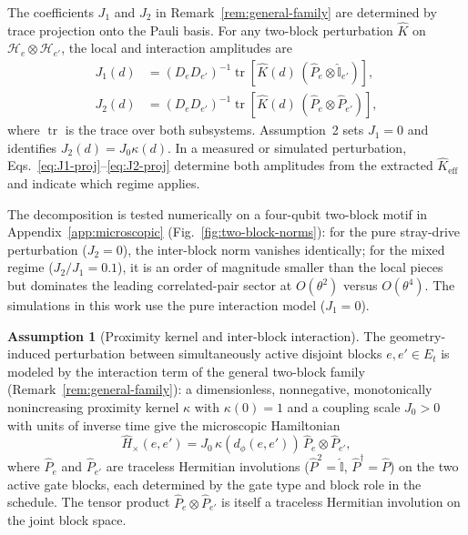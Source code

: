\documentclass[
aps,
prx,
10pt,
twocolumn,
groupedaddress,
longbibliography,
nofootinbib,
floatfix
]{revtex4-2}
\theoremstyle{definition}
\newtheorem{assumption}{Assumption}
\newcommand{\I}{\hat{\mathbb{I}}}
\newcommand{\Hx}{\hat H_{\times}}
\begin{document}
The coefficients $J_1$ and $J_2$ in Remark~\ref{rem:general-family} are determined by trace projection onto the Pauli basis. For any two-block perturbation $\hat K$ on $\mathcal{H}_e\otimes\mathcal{H}_{e'}$, the local and interaction amplitudes are
\begin{align}
J_1(d) &= (D_e D_{e'})^{-1}\operatorname{tr}\!\left[\hat K(d)\,(\hat P_e\otimes\I_{e'})\right],\label{eq:J1-proj}\\
J_2(d) &= (D_e D_{e'})^{-1}\operatorname{tr}\!\left[\hat K(d)\,(\hat P_e\otimes\hat P_{e'})\right],\label{eq:J2-proj}
\end{align}
where $\operatorname{tr}$ is the trace over both subsystems. Assumption~2 sets $J_1=0$ and identifies $J_2(d)=J_0\kappa(d)$. In a measured or simulated perturbation, Eqs.~\eqref{eq:J1-proj}--\eqref{eq:J2-proj} determine both amplitudes from the extracted $\hat K_{\mathrm{eff}}$ and indicate which regime applies.

The decomposition is tested numerically on a four-qubit two-block motif in Appendix~\ref{app:microscopic} (Fig.~\ref{fig:two-block-norms}): for the pure stray-drive perturbation ($J_2=0$), the inter-block norm vanishes identically; for the mixed regime ($J_2/J_1=0.1$), it is an order of magnitude smaller than the local pieces but dominates the leading correlated-pair sector at $O(\theta^2)$ versus $O(\theta^4)$. The simulations in this work use the pure interaction model ($J_1=0$).

\begin{assumption}[Proximity kernel and inter-block interaction]
The geometry-induced perturbation between simultaneously active disjoint blocks $e,e'\in E_t$ is modeled by the interaction term of the general two-block family (Remark~\ref{rem:general-family}): a dimensionless, nonnegative, monotonically nonincreasing proximity kernel $\kappa$ with $\kappa(0)=1$ and a coupling scale $J_0>0$ with units of inverse time give the microscopic Hamiltonian
\begin{equation}
\Hx(e,e')=J_0\,\kappa\left(d_{\phi}(e,e')\right)\,\hat P_e\otimes\hat P_{e'},
\label{eq:pair-ham-main}
\end{equation}
where $\hat P_e$ and $\hat P_{e'}$ are traceless Hermitian involutions ($\hat P^2=\I$, $\hat P^{\dagger}=\hat P$) on the two active gate blocks, each determined by the gate type and block role in the schedule. The tensor product $\hat P_e\otimes\hat P_{e'}$ is itself a traceless Hermitian involution on the joint block space.
\end{assumption}
\end{document}

